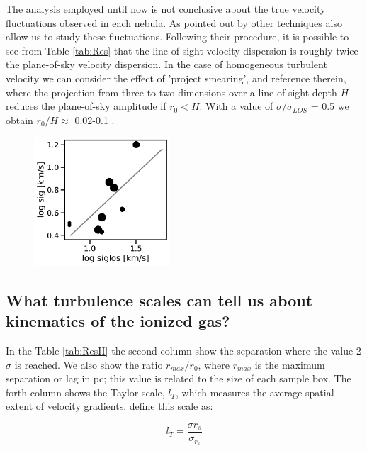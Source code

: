 \documentclass[fleqn,usenatbib, useAMS, a4paper]{mnras}
\begin{document}
The analysis employed until now is not conclusive about the true velocity fluctuations observed in each nebula. 
As pointed out by \citet{arthur2016turbulence} other techniques also allow us to study these fluctuations. 
Following their procedure, it is possible to see from Table \ref{tab:Res} that the line-of-sight velocity dispersion is roughly twice the plane-of-sky velocity dispersion.
In the case of homogeneous turbulent velocity we can consider the effect of 'project smearing', \citet{arthur2016turbulence} and reference therein, where the projection from three to two dimensions over a line-of-sight depth \(H\) reduces the plane-of-sky amplitude if \(r_{0} < H\).
With a value of \(\sigma / \sigma_{LOS}\) = 0.5 we obtain \(r_{0} / H \approx\) 0.02-0.1 \citep{1984ApJ...277..556S}. 



\begin{figure}
\centering 
\includegraphics[width=2in]{Figures/sigmas.pdf}
\caption{}
\label{fig:sigvssig}
\end{figure}

\subsection{What turbulence scales can tell us about kinematics of the ionized gas?}

In the Table \ref{tab:ResII} the second column show the separation where the value 2\(\sigma\) is reached.
We also show the ratio \(r_{max}/r_{0}\), where \(r_{max}\) is the maximum separation or lag in pc; this value is related to the size of each sample box. 
The forth column shows the Taylor scale, \(l_T\), which measures the average spatial extent of velocity gradients. \citet{1999ApJ...524..895M} define this scale as:

\begin{equation}\label{eq:TS}
l_T=\dfrac{\sigma r_s}{\sigma_{r_s}}
\end{equation}
\end{document}
